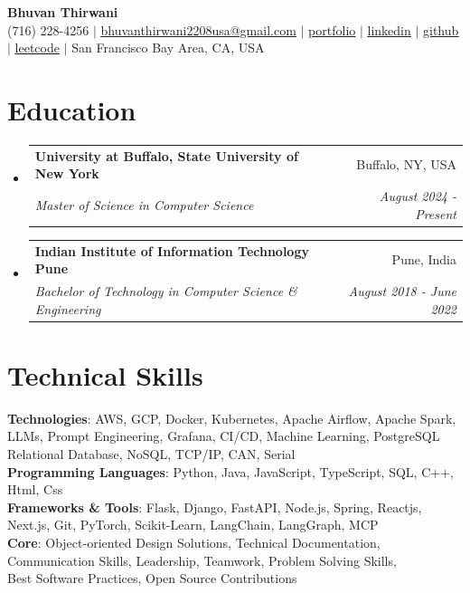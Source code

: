 \documentclass[letterpaper,10pt]{report}
\makeatletter
\newcommand{\resumeEducationSubheading}[4]{
  \vspace{-2pt}\item
    \begin{tabular*}{0.97\textwidth}[t]{l@{\extracolsep{\fill}}r}
      \textbf{#1} & #2 \\
      \textit{\small#3} & \textit{\small #4} \\
    \end{tabular*}\vspace{-7pt}
}
\newcommand{\resumeSubHeadingListStart}{\begin{itemize}[leftmargin=0.15in, label={}]}
\newcommand{\resumeSubHeadingListEnd}{\end{itemize}}
\makeatother
\begin{document}
\vspace{-50pt}
\begin{center}

    \textbf{\Huge Bhuvan Thirwani} \\ \vspace{1pt}
    (716) 228-4256 $|$ \href{mailto:bhuvanthirwani2208usa@gmail.com}{\underline{bhuvanthirwani2208usa@gmail.com}} $|$
    \href{http://portfolio.haxcodes.dev}
    {\underline{portfolio}} $|$
    \href{http://www.linkedin.com/in/dev-hax-codes}
    {\underline{linkedin}} $|$
    \href{https://github.com/bhuvanthirwani}
    {\underline{github}} $|$
    \href{http://www.leetcode.com/bhuvanthirwani}
    {\underline{leetcode}} $|$
    {San Francisco Bay Area, CA, USA}
\end{center}

\section{Education}
  \resumeSubHeadingListStart
   \resumeEducationSubheading
      {University at Buffalo, State University of New York}{Buffalo, NY, USA}
      {Master of Science in Computer Science}{August 2024 - Present}
    \resumeEducationSubheading
      {Indian Institute of Information Technology Pune}{Pune, India}
      {Bachelor of Technology in Computer Science \& Engineering}{August 2018 - June 2022}
  \resumeSubHeadingListEnd

\section{Technical Skills}
 \begin{itemize}[leftmargin=0.05in, label={}]
    \small{
        \item{
     \textbf{Technologies}{: AWS, GCP, Docker, Kubernetes, Apache Airflow, Apache Spark, LLMs, Prompt Engineering, Grafana, CI/CD, Machine Learning, PostgreSQL Relational Database, NoSQL, TCP/IP, CAN, Serial} \\
\textbf{Programming Languages}{: Python, Java, JavaScript, TypeScript, SQL, C++, Html, Css} \\
     \textbf{Frameworks \& Tools}{: Flask, Django, FastAPI, Node.js, Spring, Reactjs, Next.js, Git, PyTorch, Scikit-Learn, LangChain, LangGraph, MCP} \\
     \textbf{Core}{: Object-oriented Design Solutions, Technical Documentation, Communication Skills, Leadership, Teamwork, Problem Solving Skills, \\ Best Software Practices, Open Source Contributions}
    }
    }
 
 \end{itemize}
\end{document}
